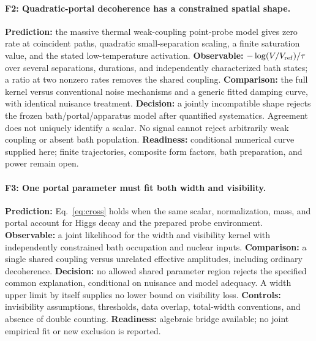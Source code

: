 \paragraph{F2: Quadratic-portal decoherence has a constrained spatial shape.}
\textbf{Prediction:} the massive thermal weak-coupling point-probe model gives zero rate at coincident paths, quadratic small-separation scaling, a finite saturation value, and the stated low-temperature activation. \textbf{Observable:} $-\log(V/V_{\rm ref})/\tau$ over several separations, durations, and independently characterized bath states; a ratio at two nonzero rates removes the shared coupling. \textbf{Comparison:} the full kernel versus conventional noise mechanisms and a generic fitted damping curve, with identical nuisance treatment. \textbf{Decision:} a jointly incompatible shape rejects the frozen bath/portal/apparatus model after quantified systematics. Agreement does not uniquely identify a scalar. No signal cannot reject arbitrarily weak coupling or absent bath population. \textbf{Readiness:} conditional numerical curve supplied here; finite trajectories, composite form factors, bath preparation, and power remain open.

\paragraph{F3: One portal parameter must fit both width and visibility.}
\textbf{Prediction:} Eq.~\eqref{eq:cross} holds when the same scalar, normalization, mass, and portal account for Higgs decay and the prepared probe environment. \textbf{Observable:} a joint likelihood for the width and visibility kernel with independently constrained bath occupation and nuclear inputs. \textbf{Comparison:} a single shared coupling versus unrelated effective amplitudes, including ordinary decoherence. \textbf{Decision:} no allowed shared parameter region rejects the specified common explanation, conditional on nuisance and model adequacy. A width upper limit by itself supplies no lower bound on visibility loss. \textbf{Controls:} invisibility assumptions, thresholds, data overlap, total-width conventions, and absence of double counting. \textbf{Readiness:} algebraic bridge available; no joint empirical fit or new exclusion is reported.

